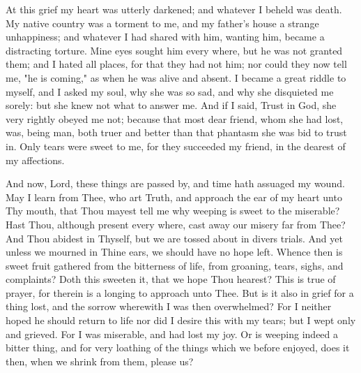 \documentclass[b5paper,openright,12pt,twoside]{book}
\begin{document}
At this grief my heart was utterly darkened; and whatever I beheld was
death. My native country was a torment to me, and my father's house a
strange unhappiness; and whatever I had shared with him, wanting him,
became a distracting torture. Mine eyes sought him every where, but he
was not granted them; and I hated all places, for that they had not him;
nor could they now tell me, "he is coming," as when he was alive and
absent. I became a great riddle to myself, and I asked my soul, why she
was so sad, and why she disquieted me sorely: but she knew not what to
answer me. And if I said, Trust in God, she very rightly obeyed me not;
because that most dear friend, whom she had lost, was, being man, both
truer and better than that phantasm she was bid to trust in. Only tears
were sweet to me, for they succeeded my friend, in the dearest of my
affections.

And now, Lord, these things are passed by, and time hath assuaged my
wound. May I learn from Thee, who art Truth, and approach the ear of my
heart unto Thy mouth, that Thou mayest tell me why weeping is sweet to
the miserable? Hast Thou, although present every where, cast away our
misery far from Thee? And Thou abidest in Thyself, but we are tossed
about in divers trials. And yet unless we mourned in Thine ears, we
should have no hope left. Whence then is sweet fruit gathered from the
bitterness of life, from groaning, tears, sighs, and complaints? Doth
this sweeten it, that we hope Thou hearest? This is true of prayer, for
therein is a longing to approach unto Thee. But is it also in grief for
a thing lost, and the sorrow wherewith I was then overwhelmed? For I
neither hoped he should return to life nor did I desire this with my
tears; but I wept only and grieved. For I was miserable, and had lost my
joy. Or is weeping indeed a bitter thing, and for very loathing of the
things which we before enjoyed, does it then, when we shrink from them,
please us?
\end{document}
